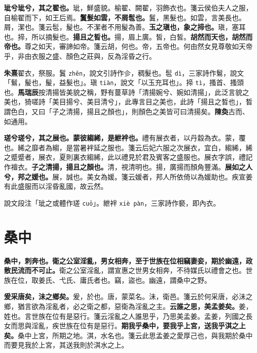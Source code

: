\textbf{玼兮玼兮，其之翟也。}{\footnotesize 玼，鮮盛貌。榆翟、闕翟，羽飾衣也。箋云侯伯夫人之服，自榆翟而下，如王后焉。}\textbf{鬒髮如雲，不屑髢也。}{\footnotesize 鬒，黑髮也。如雲，言美長也。屑，潔也。箋云髢，髲也。不潔者不用髲為善。}\textbf{玉之瑱也，象之揥也。}{\footnotesize 瑱，塞耳也。揥，所以摘髮也。}\textbf{揚且之晳也。}{\footnotesize 揚，眉上廣。皙，白皙。}\textbf{胡然而天也，胡然而帝也。}{\footnotesize 尊之如天，審諦如帝。箋云胡，何也。帝，五帝也。何由然女見尊敬如天帝乎，非由衣服之盛、顏色之莊與，反為淫昏之行。}

\begin{quoting}\textbf{朱熹}翟衣，祭服。鬒 \texttt{zhěn}，說文引詩作㐱，稠髮也。髢 \texttt{dì}，三家詩作鬄，說文「鬄，髲也，髲，益髮也」。瑱 \texttt{tiàn}，說文「以玉充耳也」。揥 \texttt{tì}，搔首、搔頭也。\textbf{馬瑞辰}按清揚皆美貌之稱，野有蔓草詩「清揚婉兮、婉如清揚」，此泛言貌之美也，猗嗟詩「美目揚兮、美目清兮」，此專言目之美也，此詩「揚且之晳也」，晳謂色白，又曰「子之清揚，揚且之顏也」，則顏色之美皆可曰清揚矣。\textbf{陳奐}古而、如通用。\end{quoting}

\textbf{瑳兮瑳兮，其之展也。蒙彼縐絺，是紲袢也。}{\footnotesize 禮有展衣者，以丹縠為衣。蒙，覆也。絺之靡者為縐，是當暑袢延之服也。箋云后妃六服之次展衣，宜白，縐絺，絺之蹙蹙者，展衣，夏則裏衣縐絺，此以禮見於君及賓客之盛服也。展衣字誤，禮記作襢衣。}\textbf{子之清揚，揚且之顏也。}{\footnotesize 清，視清明也。揚，廣揚而顏角豐滿。}\textbf{展如之人兮，邦之媛也。}{\footnotesize 展，誠也。美女為媛。箋云媛者，邦人所依倚以為媛助也。疾宣姜有此盛服而以淫昏亂國，故云然。}

\begin{quoting}說文段注「玼之或體作瑳 \texttt{cuō}」。紲袢 \texttt{xiè pàn}，三家詩作褻，即內衣。\end{quoting}

\section{桑中}


\textbf{桑中，刺奔也。衛之公室淫亂，男女相奔，至于世族在位相竊妻妾，期於幽遠，政散民流而不可止。}{\footnotesize 衛之公室淫亂，謂宣惠之世男女相奔，不待媒氏以禮會之也。世族在位，取姜氏、弋氏、庸氏者也。竊，盜也。幽遠，謂桑中之野。}

\textbf{爰采唐矣，沬之鄉矣。}{\footnotesize 爰，於也。唐，蒙菜名。沬，衛邑。箋云於何采唐，必沬之鄉，猶言欲為淫亂者，必之衛之都，惡衛為淫亂之主。}\textbf{云誰之思，美孟姜矣。}{\footnotesize 姜，姓也。言世族在位有是惡行。箋云淫亂之人誰思乎，乃思美孟姜。孟姜，列國之長女而思與淫亂，疾世族在位有是惡行。}\textbf{期我乎桑中，要我乎上宮，送我乎淇之上矣。}{\footnotesize 桑中上宮，所期之地。淇，水名也。箋云此思孟姜之愛厚己也，與我期於桑中而要見我於上宮，其送我則於淇水之上。}

